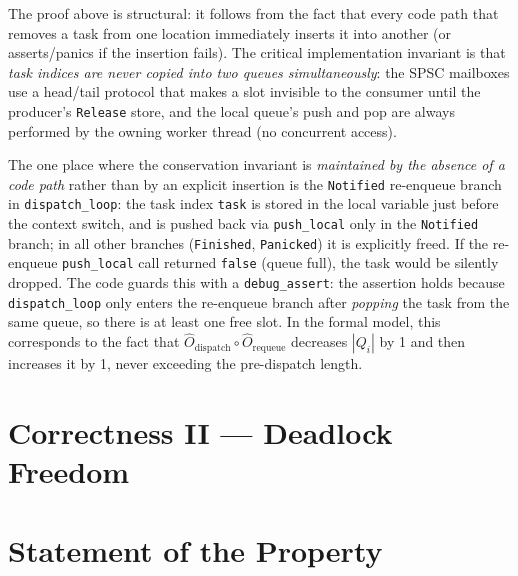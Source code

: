 \documentclass[11pt,a4paper]{article}
\newcommand{\code}[1]{\texttt{#1}}
\begin{document}
The proof above is structural: it follows from the fact that every
code path that removes a task from one location immediately inserts it
into another (or asserts/panics if the insertion fails).  The critical
implementation invariant is that \emph{task indices are never copied
into two queues simultaneously}: the SPSC mailboxes use a
head/tail protocol that makes a slot invisible to the consumer until
the producer's \code{Release} store, and the local queue's push and
pop are always performed by the owning worker thread (no concurrent
access).

The one place where the conservation invariant is \emph{maintained
by the absence of a code path} rather than by an explicit insertion
is the \code{Notified} re-enqueue branch in \code{dispatch\_loop}:
the task index \code{task} is stored in the local variable just before
the context switch, and is pushed back via \code{push\_local} only in
the \code{Notified} branch; in all other branches (\code{Finished},
\code{Panicked}) it is explicitly freed.  If the re-enqueue
\code{push\_local} call returned \code{false} (queue full), the task
would be silently dropped.  The code guards this with a
\code{debug\_assert}: the assertion holds because
\code{dispatch\_loop} only enters the re-enqueue branch after
\emph{popping} the task from the same queue, so there is at least one
free slot.  In the formal model, this corresponds to the fact that
$\hat{O}_{\text{dispatch}} \circ \hat{O}_{\text{requeue}}$ decreases
$|Q_i|$ by 1 and then increases it by 1, never exceeding the
pre-dispatch length.


\section*{Correctness II --- Deadlock Freedom}
\label{chap:deadlock}

\setcounter{section}{0}


\section{Statement of the Property}
\end{document}
